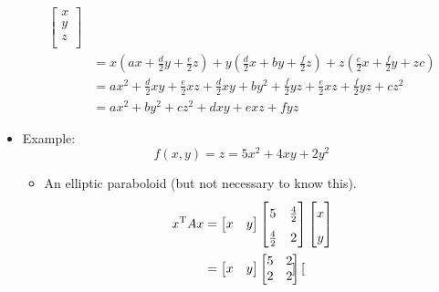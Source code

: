 \documentclass{article}
\begin{document}
\begin{itemize}
\begin{align*}
\begin{bmatrix}
            x\\
            y\\
            z\\
        \end{bmatrix}\\
        &= x\left( ax+\frac{d}{2}y+\frac{e}{2}z \right)+y\left( \frac{d}{2}x+by+\frac{f}{2}z \right)+z\left( \frac{e}{2}x+\frac{f}{2}y+zc \right)\\
        &= ax^2+\frac{d}{2}xy+\frac{e}{2}xz+\frac{d}{2}xy+by^2+\frac{f}{2}yz+\frac{e}{2}xz+\frac{f}{2}yz+cz^2\\
        &= ax^2+by^2+cz^2+dxy+exz+fyz
    \end{align*}
    \item Example:
    \begin{equation*}
        f(x,y) = z = 5x^2+4xy+2y^2
    \end{equation*}
    \begin{itemize}
        \item An elliptic paraboloid (but not necessary to know this).
        \begin{align*}
            x^\T Ax &=
            \renewcommand{\arraystretch}{1}
            \begin{bmatrix}
                x & y\\
            \end{bmatrix}
            \renewcommand{\arraystretch}{1.6}
            \begin{bmatrix}
                5 & \frac{4}{2}\\
                \frac{4}{2} & 2\\
            \end{bmatrix}
            \begin{bmatrix}
                x\\
                y\\
            \end{bmatrix}\\
            &=
            \renewcommand{\arraystretch}{1}
            \begin{bmatrix}
                x & y\\
            \end{bmatrix}
            \begin{bmatrix}
                5 & 2\\
                2 & 2\\
            \end{bmatrix}
            \begin{bmatrix}

\end{bmatrix}
\end{align*}
\end{itemize}
\end{itemize}
\end{document}
